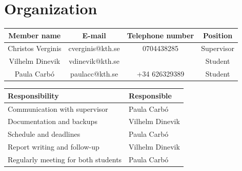 \documentclass{article}
\begin{document}
	\section{Organization}
	\begin{center}
		\begin{tabular}{|c|c|c|c|} \hline
			Member name & E-mail & Telephone number & Position \\ \hline
			Christos Verginis & cverginis@kth.se & 0704438285 & Supervisor \\ \hline
			Vilhelm Dinevik & vdinevik@kth.se & & Student\\ \hline
			Paula Carbó & paulacc@kth.se & +34 626329389 & Student\\ \hline
		\end{tabular}
		
		\bigskip
		
		\begin{tabular}{|C{6cm}|C{4cm}|} \hline
			Responsibility & Responsible \\ \hline
			Communication with supervisor & Paula Carbó \\ \hline
			Documentation and backups & Vilhelm Dinevik \\ \hline
			Schedule and deadlines & Paula Carbó \\ \hline
			Report writing and follow-up & Vilhelm Dinevik \\ \hline
			Regularly meeting for both students & Paula Carbó \\ \hline
		\end{tabular}
		
	\end{center}

	\bigskip
\end{document}
